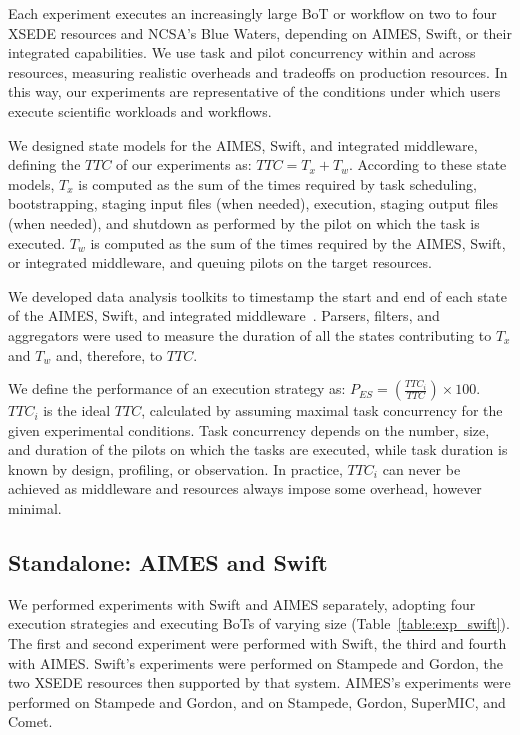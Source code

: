 \documentclass[10pt, conference, compsocconf]{IEEEtran}
\begin{document}
Each experiment executes an increasingly large BoT or workflow on two to four
XSEDE resources and NCSA's Blue Waters, depending on AIMES, Swift, or their
integrated capabilities. We use task and pilot concurrency within and across
resources, measuring realistic overheads and tradeoffs on production
resources. In this way, our experiments are representative of the conditions
under which users execute scientific workloads and workflows.

We designed state models for the AIMES, Swift, and integrated middleware,
defining the \(TTC\) of our experiments as: \(TTC = T_x + T_w\). According to
these state models, \(T_x\) is computed as the sum of the times required by
task scheduling, bootstrapping, staging input files (when needed), execution,
staging output files (when needed), and shutdown as performed by the pilot on
which the task is executed. \(T_w\) is computed as the sum of the times
required by the AIMES, Swift, or integrated middleware, and queuing pilots on
the target resources.

We developed data analysis toolkits to timestamp the start and end of each
state of the AIMES, Swift, and integrated
middleware~\cite{aimes_swift_experiments_url}. Parsers, filters, and
aggregators were used to measure the duration of all the states contributing
to \(T_x\) and \(T_w\) and, therefore, to \(TTC\).

We define the performance of an execution strategy as: \(P_{ES} =
(\frac{TTC_i}{TTC}) \times 100\). \(TTC_i\) is the ideal \(TTC\), calculated
by assuming maximal task concurrency for the given experimental conditions.
Task concurrency depends on the number, size, and duration of the pilots on
which the tasks are executed, while task duration is known by design,
profiling, or observation. In practice, \(TTC_i\) can never be achieved as
middleware and resources always impose some overhead, however minimal.

\subsection{Standalone: AIMES and Swift}\label{ssec:exp_aimes_swift}

We performed experiments with Swift and AIMES separately, adopting four
execution strategies and executing BoTs of varying size
(Table~\ref{table:exp_swift}). The first and second experiment were performed
with Swift, the third and fourth with AIMES\@. Swift's experiments were
performed on Stampede and Gordon, the two XSEDE resources then supported by
that system. AIMES's experiments were performed on Stampede and Gordon, and
on Stampede, Gordon, SuperMIC, and Comet.
\end{document}

